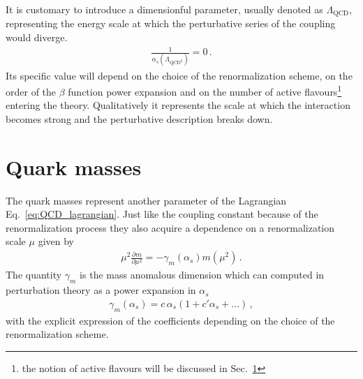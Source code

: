 It is customary to introduce a dimensionful parameter, usually denoted as $\Lambda_{\text{QCD}}$, representing the energy 
scale at which the perturbative series of the coupling would diverge.
\begin{align}
    \label{eq:lambda_QCD}
    \frac{1}{\alpha_s\left(\Lambda_{\text{QCD}^2}\right)} = 0\,.
\end{align}
Its specific value will depend on the choice of the renormalization scheme, on the order
of the $\beta$ function power expansion and on the number of active flavours\footnote{the notion of active flavours will
be discussed in Sec.~\ref{sec:quark_masses}} entering the theory.
Qualitatively it represents the scale at which the interaction becomes strong and the perturbative description breaks down.

\section{Quark masses}
\label{sec:quark_masses}
The quark masses represent another parameter of the Lagrangian Eq.~\ref{eq:QCD_lagrangian}.
Just like the coupling constant because of the renormalization process they also acquire a
dependence on a renormalization scale $\mu$ given by 
\begin{align}
    \label{eq:renormalization_mass}
    \mu^2\frac{\partial m }{\partial \mu^2} = - \gamma_m\left(\alpha_s\right)m\left(\mu^2\right)\,.
\end{align}
The quantity $\gamma_m$ is the mass anomalous dimension which can computed in perturbation theory as
a power expansion in $\alpha_s$
\begin{align}
    \gamma_m\left(\alpha_s\right) = c\,\alpha_s\left(1+c'\alpha_s + ...\right)\,,
\end{align}
with the explicit expression of the coefficients depending on the choice of the renormalization scheme.

